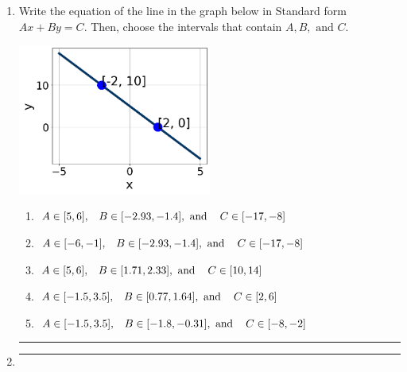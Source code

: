 \documentclass[14pt]{extbook}
\newcommand{\litem}[1]{\item#1\hspace*{-1cm}\rule{\textwidth}{0.4pt}}
\begin{document}
\begin{enumerate}
\litem{
Write the equation of the line in the graph below in Standard form $Ax+By=C$. Then, choose the intervals that contain $A, B, \text{ and } C$.
\begin{center}
    \includegraphics[width=0.5\textwidth]{../Figures/linearGraphToStandardB.png}
\end{center}
\begin{enumerate}[label=\Alph*.]
\item \( A \in [5, 6], \hspace{3mm} B \in [-2.93, -1.4], \text{ and } \hspace{3mm} C \in [-17, -8] \)
\item \( A \in [-6, -1], \hspace{3mm} B \in [-2.93, -1.4], \text{ and } \hspace{3mm} C \in [-17, -8] \)
\item \( A \in [5, 6], \hspace{3mm} B \in [1.71, 2.33], \text{ and } \hspace{3mm} C \in [10, 14] \)
\item \( A \in [-1.5, 3.5], \hspace{3mm} B \in [0.77, 1.64], \text{ and } \hspace{3mm} C \in [2, 6] \)
\item \( A \in [-1.5, 3.5], \hspace{3mm} B \in [-1.8, -0.31], \text{ and } \hspace{3mm} C \in [-8, -2] \)

\end{enumerate} }
\litem{
\begin{enumerate}[label=\Alph*.]


\end{enumerate}}
\end{enumerate}
\end{document}
